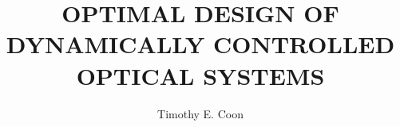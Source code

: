 \documentclass[]{afit-etd}
\title           {\MakeUppercase{Optimal Design of Dynamically Controlled Optical Systems}}
\author          {Timothy E. Coon}
\begin{document}
\makePrefatoryPages %


% 
% 
% 
% 
% 

\end{document}
